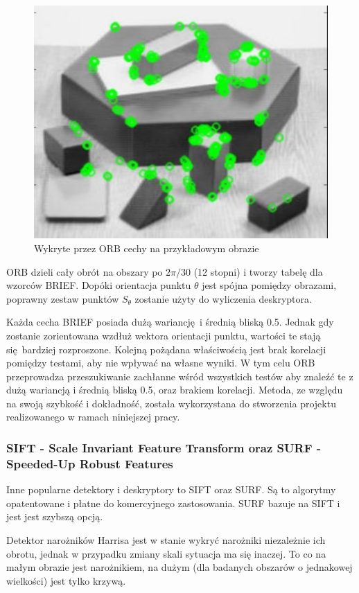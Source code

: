 \documentclass[12pt,twoside,polish]{article}
\begin{document}
\begin{figure}
	\centering
		\includegraphics{orb_kp}
	\caption{Wykryte przez ORB cechy na przykładowym obrazie \cite{orbkp}}
\end{figure}

ORB dzieli cały obrót na obszary po $2\pi/30$ (12 stopni) i tworzy tabelę dla wzorców BRIEF. Dopóki orientacja punktu $\theta$ jest spójna pomiędzy obrazami, poprawny zestaw punktów $S_\theta$ zostanie użyty do wyliczenia deskryptora.

Każda cecha BRIEF posiada dużą wariancję i średnią bliską 0.5. Jednak gdy zostanie zorientowana wzdłuż wektora orientacji punktu, wartości te stają się bardziej rozproszone. Kolejną pożądana właściwością jest brak korelacji pomiędzy testami, aby nie wpływać na własne wyniki. W tym celu ORB przeprowadza przeszukiwanie zachłanne wśród wszystkich testów aby znaleźć te z dużą wariancją i średnią bliską 0.5, oraz brakiem korelacji. Metoda, ze względu na swoją szybkość i dokładność, została wykorzystana do stworzenia projektu realizowanego w ramach niniejszej pracy.

\subsubsection[SIFT i SURF]{SIFT - Scale Invariant Feature Transform oraz SURF - Speeded-Up Robust Features}
Inne popularne detektory i deskryptory to SIFT oraz SURF. Są to algorytmy opatentowane i płatne do komercyjnego zastosowania. SURF bazuje na SIFT i jest jest szybszą opcją.

Detektor narożników Harrisa jest w stanie wykryć narożniki niezależnie ich obrotu, jednak w przypadku zmiany skali sytuacja ma się inaczej. To co na małym obrazie jest narożnikiem, na dużym (dla badanych obszarów o jednakowej wielkości) jest tylko krzywą.
\end{document}
